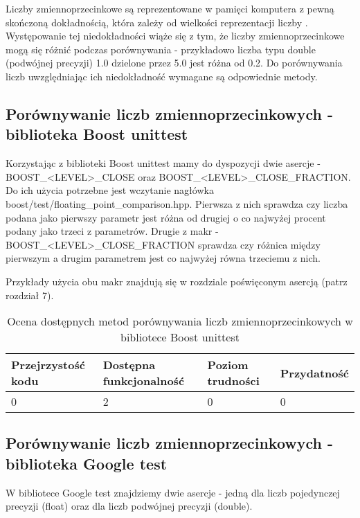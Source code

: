 \documentclass[12pt,a4paper,notitlepage]{report}
\begin{document}
Liczby zmiennoprzecinkowe są reprezentowane w pamięci komputera z pewną skończoną dokładnością, która zależy od wielkości reprezentacji liczby \cite{IEEE754}. Występowanie tej niedokładności wiąże się z tym, że liczby zmiennoprzecinkowe mogą się różnić podczas porównywania - przykładowo liczba typu double (podwójnej precyzji) 1.0 dzielone przez 5.0 jest różna od 0.2.
Do porównywania liczb uwzględniając ich niedokładność wymagane są odpowiednie metody.

\subsection{Porównywanie liczb zmiennoprzecinkowych - biblioteka Boost unittest}

Korzystając z biblioteki Boost unittest mamy do dyspozycji dwie asercje - BOOST{\_}<LEVEL>{\_}CLOSE oraz BOOST{\_}<LEVEL>{\_}CLOSE{\_}FRACTION. Do ich użycia potrzebne jest wczytanie nagłówka boost/test/floating{\_}point{\_}comparison.hpp.
Pierwsza z nich sprawdza czy liczba podana jako pierwszy parametr jest różna od drugiej o co najwyżej procent podany jako trzeci z parametrów.
Drugie z makr - BOOST{\_}<LEVEL>{\_}CLOSE{\_}FRACTION sprawdza czy różnica między pierwszym a drugim parametrem jest co najwyżej równa trzeciemu z nich.

Przykłady użycia obu makr znajdują się w rozdziale poświęconym asercją (patrz rozdział 7).

\begin{center}
			\begin{table}[!ht]
			\caption{Ocena dostępnych metod porównywania liczb zmiennoprzecinkowych w bibliotece Boost unittest}
			\label{}
			\begin{tabular}[!hc]{|l|l|l|l|}
		\hline
		Przejrzystość kodu 	&	Dostępna funkcjonalność	&	Poziom trudności	&	Przydatność \\ \hline
		0					&	2						&	0					& 	0  			\\ \hline
			\end{tabular}
			\end{table} 
		\end{center}

\subsection{Porównywanie liczb zmiennoprzecinkowych - biblioteka Google test}

W bibliotece Google test znajdziemy dwie asercje - jedną dla liczb pojedynczej precyzji (float) oraz dla liczb podwójnej precyzji (double).
\end{document}
